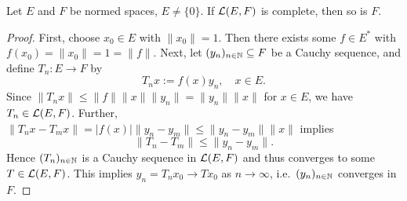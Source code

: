 \begin{theo}
Let $E$ and $F$ be normed spaces, $E\neq\{0\}$. If $\mathcal L(E,F)$ is complete, then so is $F$.
\end{theo}
\begin{proof}
First, choose $x_0\in E$ with $\|x_0\|=1$. Then there exists some $f\in E^*$ with $f(x_0) = \|x_0\| = 1 = \|f\|$. Next, let $(y_n)_{n\in\mathbb{N}}\subseteq F$ be a Cauchy sequence, and define $T_n : E\to F$ by
$$
T_nx := f(x)y_n,\quad x\in E.
$$
Since $\|T_nx\|\le\|f\|\|x\|\|y_n\| = \|y_n\|\|x\|$ for $x\in E$, we have $T_n\in\mathcal L(E,F)$. Further, $\|T_n x- T_m x\| = |f(x)|\|y_n - y_m\|\le\|y_n - y_m\|\|x\|$ implies
$$
\|T_n - T_m\|\le\|y_n - y_m\|.
$$
Hence $(T_n)_{n\in\mathbb{N}}$ is a Cauchy sequence in $\mathcal L(E,F)$ and thus converges to some $T\in\mathcal L(E,F)$. This implies $y_n = T_nx_0\to Tx_0$ as $n\to\infty$, i.e.\ $(y_n)_{n\in\mathbb{N}}$ converges in $F$.
\end{proof}

